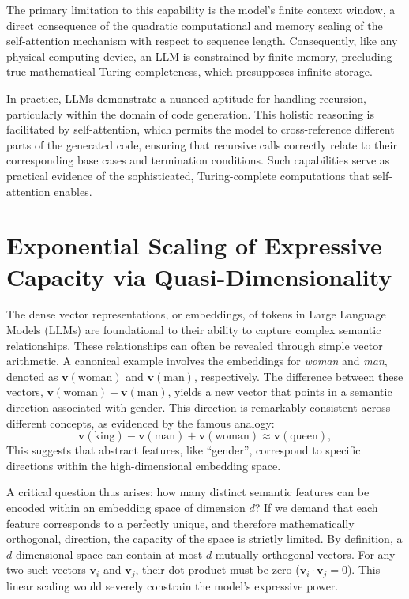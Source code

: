 \documentclass[%
  reprint,
  superscriptaddress,
  showpacs,
  showkeys,
  amsmath,amssymb,
  pra,
  longbibliography,
  floatfix,
  x11names
]{revtex4-2}
\begin{document}
The primary limitation to this capability is the model's finite context window, a direct consequence of the quadratic computational and memory scaling of the self-attention mechanism with respect to sequence length. Consequently, like any physical computing device, an LLM is constrained by finite memory, precluding true mathematical Turing completeness, which presupposes infinite storage.

In practice, LLMs demonstrate a nuanced aptitude for handling recursion, particularly within the domain of code generation. This holistic reasoning is facilitated by self-attention, which permits the model to cross-reference different parts of the generated code, ensuring that recursive calls correctly relate to their corresponding base cases and termination conditions. Such capabilities serve as practical evidence of the sophisticated, Turing-complete computations that self-attention enables.




\section{Exponential Scaling of Expressive Capacity via Quasi-Dimensionality}
\label{section:ExpScal}

The dense vector representations, or embeddings, of tokens in Large Language Models (LLMs) are foundational
to their ability to capture complex semantic relationships. These relationships can often be revealed through simple vector arithmetic.
A canonical example involves the embeddings for \textit{woman} and \textit{man},
denoted as $\bm{v}(\text{woman})$ and $\bm{v}(\text{man})$, respectively.
The difference between these vectors, $\bm{v}(\text{woman}) - \bm{v}(\text{man})$,
yields a new vector that points in a semantic direction associated with gender.
 This direction is remarkably consistent across different concepts, as evidenced by the famous analogy:
\begin{equation}
    \bm{v}(\text{king}) - \bm{v}(\text{man}) + \bm{v}(\text{woman}) \approx \bm{v}(\text{queen}),
\end{equation}
This suggests that abstract features, like ``gender'', correspond to specific directions within the high-dimensional embedding space.

A critical question thus arises: how many distinct semantic features can be encoded within an embedding space of dimension $d$?
If we demand that each feature corresponds to a perfectly unique, and therefore mathematically orthogonal, direction,
the capacity of the space is strictly limited. By definition, a $d$-dimensional space can contain at most $d$ mutually orthogonal vectors. For any two such vectors $\bm{v}_i$ and $\bm{v}_j$, their dot product must be zero ($\bm{v}_i \cdot \bm{v}_j = 0$).
This linear scaling would severely constrain the model's expressive power.
\end{document}
